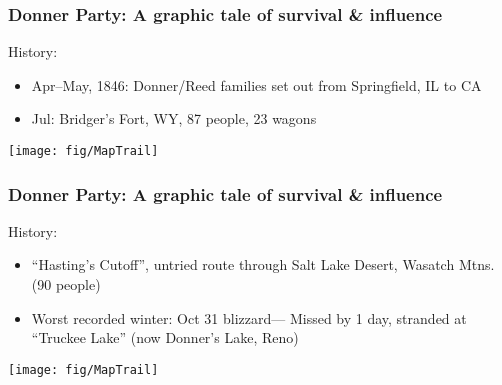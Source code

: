\begin{frame}
\frametitle{Donner Party: A graphic tale of survival \& influence}
History:
\begin{itemize}
\item Apr--May, 1846: Donner/Reed families set out from Springfield, IL to CA
\item Jul: Bridger's Fort, WY, 87 people, 23 wagons

\end{itemize}

\begin{center}
  \texttt{[image: fig/MapTrail]}
\end{center}
\end{frame}

\begin{frame}
\frametitle{Donner Party: A graphic tale of survival \& influence}
History:
\begin{itemize}
\item ``Hasting's Cutoff'', untried route through Salt Lake Desert, Wasatch Mtns. (90 people)
\item Worst recorded winter: Oct 31 blizzard--- 
Missed by 1 day, stranded at ``Truckee Lake'' (now Donner's Lake, Reno)

\end{itemize}

\begin{center}
  \texttt{[image: fig/MapTrail]}
\end{center}
\end{frame}

